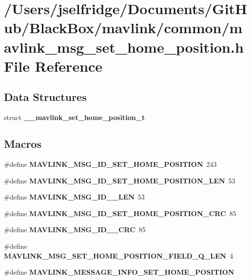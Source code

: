 \section{/\+Users/jselfridge/\+Documents/\+Git\+Hub/\+Black\+Box/mavlink/common/mavlink\+\_\+msg\+\_\+set\+\_\+home\+\_\+position.h File Reference}
\label{mavlink__msg__set__home__position_8h}
\subsection*{Data Structures}
\begin{DoxyCompactItemize}
\item 
struct \textbf{ \+\_\+\+\_\+mavlink\+\_\+set\+\_\+home\+\_\+position\+\_\+t}
\end{DoxyCompactItemize}
\subsection*{Macros}
\begin{DoxyCompactItemize}
\item 
\#define \textbf{ M\+A\+V\+L\+I\+N\+K\+\_\+\+M\+S\+G\+\_\+\+I\+D\+\_\+\+S\+E\+T\+\_\+\+H\+O\+M\+E\+\_\+\+P\+O\+S\+I\+T\+I\+ON}~243
\item 
\#define \textbf{ M\+A\+V\+L\+I\+N\+K\+\_\+\+M\+S\+G\+\_\+\+I\+D\+\_\+\+S\+E\+T\+\_\+\+H\+O\+M\+E\+\_\+\+P\+O\+S\+I\+T\+I\+O\+N\+\_\+\+L\+EN}~53
\item 
\#define \textbf{ M\+A\+V\+L\+I\+N\+K\+\_\+\+M\+S\+G\+\_\+\+I\+D\+\_\+\_\+\+L\+EN}~53
\item 
\#define \textbf{ M\+A\+V\+L\+I\+N\+K\+\_\+\+M\+S\+G\+\_\+\+I\+D\+\_\+\+S\+E\+T\+\_\+\+H\+O\+M\+E\+\_\+\+P\+O\+S\+I\+T\+I\+O\+N\+\_\+\+C\+RC}~85
\item 
\#define \textbf{ M\+A\+V\+L\+I\+N\+K\+\_\+\+M\+S\+G\+\_\+\+I\+D\+\_\+\_\+\+C\+RC}~85
\item 
\#define \textbf{ M\+A\+V\+L\+I\+N\+K\+\_\+\+M\+S\+G\+\_\+\+S\+E\+T\+\_\+\+H\+O\+M\+E\+\_\+\+P\+O\+S\+I\+T\+I\+O\+N\+\_\+\+F\+I\+E\+L\+D\+\_\+\+Q\+\_\+\+L\+EN}~4
\item 
\#define \textbf{ M\+A\+V\+L\+I\+N\+K\+\_\+\+M\+E\+S\+S\+A\+G\+E\+\_\+\+I\+N\+F\+O\+\_\+\+S\+E\+T\+\_\+\+H\+O\+M\+E\+\_\+\+P\+O\+S\+I\+T\+I\+ON}
\end{DoxyCompactItemize}
